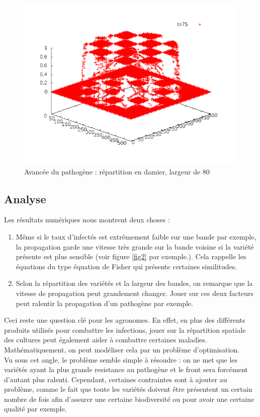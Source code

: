 \documentclass{article}
\begin{document}
\begin{figure}[!h]
	\includegraphics[scale=0.25]{img/anim2-80-150.png}
\caption{Avancée du pathogène : répartition en damier, largeur de 80}
\label{fig4}
\end{figure}

\clearpage
\subsection{Analyse}
Les résultats numériques nous montrent deux choses :
\begin{enumerate}
	\item Même si le taux d'infectés est extrêmement faible sur une bande par exemple, la propagation garde une vitesse très grande sur la bande voisine si la variété présente est plus sensible (voir figure \ref{fig2} par exemple.). Cela rappelle les équations du type équation de Fisher qui présente certaines similitudes.
	\item Selon la répartition des variétés et la largeur des bandes, on remarque que la vitesse de propagation peut grandement changer. Jouer sur ces deux facteurs peut ralentir la propagation d'un pathogène par exemple.
\end{enumerate}
Ceci reste une question clé pour les agronomes. En effet, en plus des différents produits utilisés pour combattre les infections, jouer sur la répartition spatiale des cultures peut également aider à combattre certaines maladies. Mathématiquement, on peut modéliser cela par un problème d'optimisation.\\
Vu sous cet angle, le problème semble simple à résoudre : on ne met que les variétés ayant la plus grande resistance au pathogène et le front sera forcément d'autant plus ralenti. Cependant, certaines contraintes sont à ajouter au problème, comme le fait que toute les variétés doivent être présentent un certain nombre de fois afin d'assurer une certaine biodiversité ou pour avoir une certaine qualité par exemple.
\end{document}

